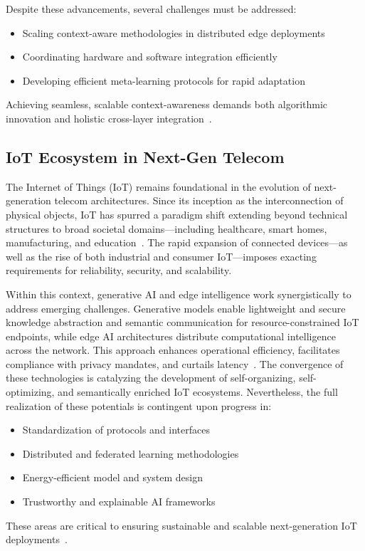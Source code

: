 \documentclass[sigconf]{acmart}
\begin{document}
Despite these advancements, several challenges must be addressed:
\begin{itemize}
    \item Scaling context-aware methodologies in distributed edge deployments
    \item Coordinating hardware and software integration efficiently
    \item Developing efficient meta-learning protocols for rapid adaptation
\end{itemize}
Achieving seamless, scalable context-awareness demands both algorithmic innovation and holistic cross-layer integration~\cite{ref27,ref28,ref39}.

\subsection{IoT Ecosystem in Next-Gen Telecom}

The Internet of Things (IoT) remains foundational in the evolution of next-generation telecom architectures. Since its inception as the interconnection of physical objects, IoT has spurred a paradigm shift extending beyond technical structures to broad societal domains—including healthcare, smart homes, manufacturing, and education~\cite{ref45}. The rapid expansion of connected devices—as well as the rise of both industrial and consumer IoT—imposes exacting requirements for reliability, security, and scalability.

Within this context, generative AI and edge intelligence work synergistically to address emerging challenges. Generative models enable lightweight and secure knowledge abstraction and semantic communication for resource-constrained IoT endpoints, while edge AI architectures distribute computational intelligence across the network. This approach enhances operational efficiency, facilitates compliance with privacy mandates, and curtails latency~\cite{ref44,ref45,ref49}. The convergence of these technologies is catalyzing the development of self-organizing, self-optimizing, and semantically enriched IoT ecosystems. Nevertheless, the full realization of these potentials is contingent upon progress in:
\begin{itemize}
    \item Standardization of protocols and interfaces
    \item Distributed and federated learning methodologies
    \item Energy-efficient model and system design
    \item Trustworthy and explainable AI frameworks
\end{itemize}
These areas are critical to ensuring sustainable and scalable next-generation IoT deployments~\cite{ref44,ref45}.
\end{document}
